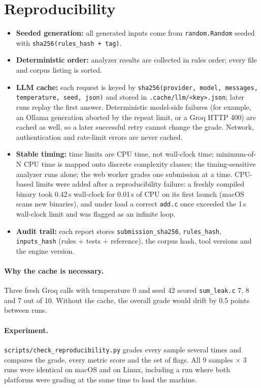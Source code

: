 \documentclass[11pt,a4paper]{article}
\newcommand{\file}[1]{\nolinkurl{#1}}
\begin{document}
\section{Reproducibility}\label{sec:repro}
\begin{itemize}
  \item \textbf{Seeded generation:} all generated inputs come from \texttt{random.Random} seeded with
        \texttt{sha256(rules\_hash + tag)}.
  \item \textbf{Deterministic order:} analyzer results are collected in rules order; every file and corpus listing is sorted.
  \item \textbf{LLM cache:} each request is keyed by \texttt{sha256(provider, model, messages, temperature, seed, json)} and
        stored in \file{.cache/llm/<key>.json}; later runs replay the first answer. Deterministic model-side failures
        (for example, an Ollama generation aborted by the repeat limit, or a Groq HTTP 400) are cached as well, so a
        later successful retry cannot change the grade. Network, authentication and rate-limit errors are never cached.
  \item \textbf{Stable timing:} time limits are CPU time, not wall-clock time; minimum-of-N CPU time is mapped onto
        discrete complexity classes; the timing-sensitive analyzer runs alone; the web worker grades one submission at a time.
        CPU-based limits were added after a reproducibility failure: a freshly compiled binary took 0.42\,s wall-clock
        for 0.01\,s of CPU on its first launch (macOS scans new binaries), and under load a correct \file{add.c} once
        exceeded the 1\,s wall-clock limit and was flagged as an infinite loop.
  \item \textbf{Audit trail:} each report stores \texttt{submission\_sha256}, \texttt{rules\_hash}, \texttt{inputs\_hash}
        (rules + tests + reference), the corpus hash, tool versions and the engine version.
\end{itemize}

\paragraph{Why the cache is necessary.} Three fresh Groq calls with temperature 0 and seed 42 scored
\file{sum_leak.c} 7, 8 and 7 out of 10. Without the cache, the overall grade would drift by 0.5 points between runs.

\paragraph{Experiment.} \file{scripts/check_reproducibility.py} grades every sample several times and compares the
grade, every metric score and the set of flags. All 9 samples $\times$ 3 runs were identical on macOS and on Linux,
including a run where both platforms were grading at the same time to load the machine.
\end{document}
